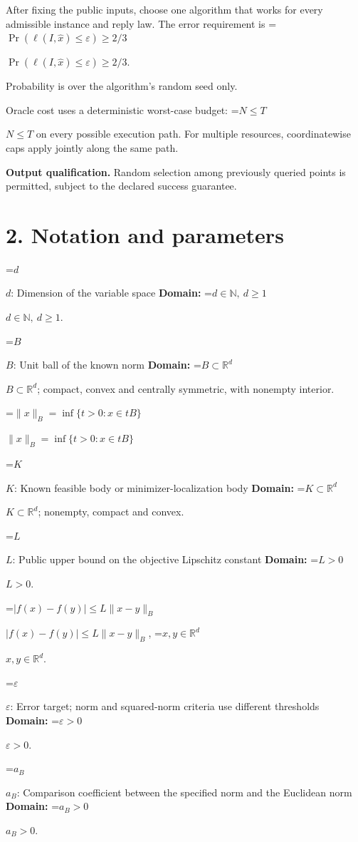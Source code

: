 \documentclass[10pt,a4paper]{article}
\newcommand{\AtlasMath}[1]{\par\begingroup\centering\setbox0=\hbox{$\displaystyle #1$}\ifdim\wd0>1.4\linewidth\typeout{ATLAS WIDE FORMULA: \the\wd0}\fi\ifdim\wd0>\linewidth\resizebox{\linewidth}{!}{\box0}\else\box0\fi\par\endgroup}
\newcommand{\AtlasInlineMath}[1]{\begingroup\setbox0=\hbox{$#1$}\ifdim\wd0>.4\linewidth\endgroup\AtlasMath{#1}\else\endgroup$#1$\fi}
\begin{document}
After fixing the public inputs, choose one algorithm that works for every admissible instance and reply law. The error requirement is \AtlasInlineMath{\Pr(\ell(I,\widehat{x})\le \varepsilon)\ge2/3}.



Probability is over the algorithm's random seed only.



Oracle cost uses a deterministic worst-case budget: \AtlasInlineMath{N\le T} on every possible execution path. For multiple resources, coordinatewise caps apply jointly along the same path.



\textbf{Output qualification.} Random selection among previously queried points is permitted, subject to the declared success guarantee.



\section{2. Notation and parameters}


\AtlasInlineMath{d}: Dimension of the variable space \textbf{Domain:} \AtlasInlineMath{d\in\mathbb{N},\ d\ge1}.



\AtlasInlineMath{B}: Unit ball of the known norm \textbf{Domain:} \AtlasInlineMath{B\subset\mathbb{R}^d}; compact, convex and centrally symmetric, with nonempty interior.



\AtlasInlineMath{\|x\|_B=\inf\{t>0:x\in tB\}}



\AtlasInlineMath{K}: Known feasible body or minimizer-localization body \textbf{Domain:} \AtlasInlineMath{K\subset\mathbb{R}^d}; nonempty, compact and convex.



\AtlasInlineMath{L}: Public upper bound on the objective Lipschitz constant \textbf{Domain:} \AtlasInlineMath{L>0}.



\AtlasInlineMath{|f(x)-f(y)|\le L\|x-y\|_B}, \AtlasInlineMath{x,y\in\mathbb{R}^d}.



\AtlasInlineMath{\varepsilon}: Error target; norm and squared-norm criteria use different thresholds \textbf{Domain:} \AtlasInlineMath{\varepsilon>0}.



\AtlasInlineMath{a_B}: Comparison coefficient between the specified norm and the Euclidean norm \textbf{Domain:} \AtlasInlineMath{a_B>0}.
\end{document}
